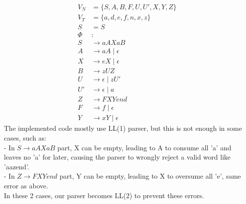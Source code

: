 \documentclass[10pt, a4paper]{article}
\begin{document}
\begin{align*}
V_N &= \{S, A, B, F, U,U', X, Y, Z\} \\
V_T &= \{a, d, e, f, n, x, z\} \\
S &= S \\
\Phi &: \\
S &\rightarrow a A X a B \\
A &\rightarrow a A  \mid   \epsilon \\
X &\rightarrow e X  \mid \epsilon \\
B &\rightarrow z U Z \\
U &\rightarrow \epsilon \mid z U' \\
U' &\rightarrow \epsilon \mid a \\
Z &\rightarrow F X Y end \\
F &\rightarrow f \mid \epsilon \\
Y &\rightarrow x Y \mid \epsilon
\end{align*}
The implemented code mostly use LL(1) parser, but this is not enough in some cases, such as:\\
- In $ S  \rightarrow a A X a B  $ part, X can be empty, leading to A to consume all 'a' and leaves no 'a' for later, causing the parser to wrongly reject a valid word like 'aazend'. \\
- In $Z \rightarrow F X Y end$ part, Y can be empty, leading to X to oversume all 'e', same error as above.\\
In these 2 cases, our parser becomes LL(2) to prevent these errors.
\end{document}
